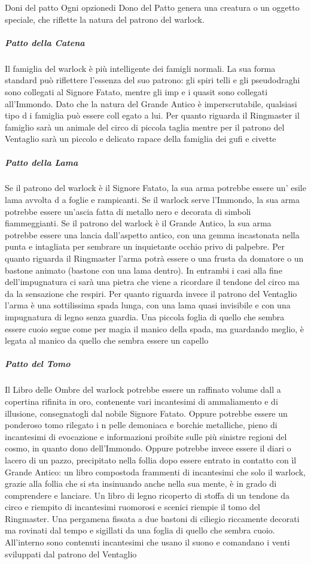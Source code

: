 \begin{DndSidebar}[float=!h]{Doni del patto}
Ogni opzionedi Dono del Patto genera una creatura o un oggetto
speciale, che riflette la natura del patrono del warlock.
\subparagraph{Patto della Catena} Il famiglia del warlock è più intelligente dei famigli normali. La sua forma standard può riflettere l'essenza del suo patrono: gli spiri telli e gli pseudodraghi sono collegati al Signore Fatato, mentre gli imp e i quasit sono collegati all'Immondo. Dato che la natura del Grande Antico è imperscrutabile, qualsiasi tipo d i famiglia può essere coll egato a lui. Per quanto riguarda il Ringmaster il famiglio sarà un animale del circo di piccola taglia mentre per il patrono del Ventaglio sarà un piccolo e delicato rapace della famiglia dei gufi e civette
\subparagraph{Patto della Lama} Se il patrono del warlock è il Signore Fatato, la sua arma potrebbe essere un' esile lama avvolta d a foglie e rampicanti. Se il warlock serve l'Immondo, la sua arma potrebbe essere un'ascia fatta di metallo nero e decorata di simboli fiammeggianti. Se il patrono del warlock è il Grande Antico, la sua arma potrebbe essere una lancia dall'aspetto antico, con una gemma incastonata nella punta e intagliata per sembrare un inquietante occhio privo di palpebre. Per quanto riguarda il Ringmaster l'arma potrà essere o una frusta da domatore o un bastone animato (bastone con una lama dentro). In entrambi i casi alla fine dell'impugnatura ci sarà una pietra che viene a ricordare il tendone del circo ma da la sensazione che respiri. Per quanto riguarda invece il patrono del Ventaglio l'arma è una sottilissima spada lunga, con una lama quasi invisibile e con una impugnatura di legno senza guardia. Una piccola foglia di quello che sembra essere cuoio segue come per magia il manico della spada, ma guardando meglio, è legata al manico da quello che sembra essere un capello
\subparagraph{Patto del Tomo} Il Libro delle Ombre del warlock potrebbe essere un raffinato volume dall a copertina rifinita in oro, contenente vari incantesimi di ammaliamento e di illusione, consegnatogli dal nobile Signore Fatato.
Oppure potrebbe essere un ponderoso tomo rilegato i n pelle demoniaca e borchie metalliche, pieno di incantesimi di evocazione e informazioni proibite sulle più sinistre regioni del cosmo, in quanto dono dell'Immondo. Oppure potrebbe invece essere il diari o lacero di un pazzo, precipitato nella follia dopo essere entrato in contatto con ìl Grande Antico: un libro compostoda frammenti di incantesimi che solo il warlock, grazie alla follia che si sta insinuando anche nella sua mente, è in grado di comprendere e lanciare. Un libro di legno ricoperto di stoffa di un tendone da circo e riempito di incantesimi ruomorosi e scenici riempie il tomo del Ringmaster. Una pergamena fissata a due bastoni di ciliegio riccamente decorati ma rovinati dal tempo e sigillati da una foglia di quello che sembra cuoio. All'interno sono contenuti incantesimi che usano il suono e comandano i venti sviluppati dal patrono del Ventaglio

\end{DndSidebar}
